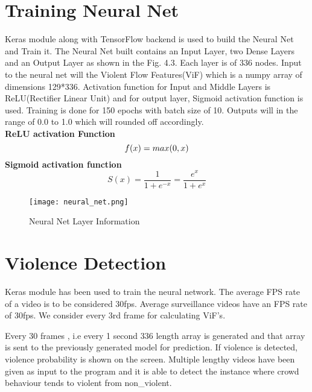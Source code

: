 \section{Training Neural Net}
Keras\cite{keras} module along with TensorFlow\cite{tensorflow} backend is used to build the Neural Net and Train it. The Neural Net built contains an Input Layer, two Dense Layers and an Output Layer as shown in the Fig. 4.3. Each layer is of 336 nodes. Input to the neural net will the Violent Flow Features(ViF) which is a numpy array of dimensions 129*336. Activation function for Input and Middle Layers is ReLU(Rectifier Linear Unit) and for output layer, Sigmoid activation function is used. Training is done for 150 epochs with batch size of 10. Outputs will in the range of 0.0 to 1.0 which will rounded off accordingly. \\
\textbf{ReLU activation Function} \\
\begin{equation}
f(x) = max(0,x)\\
\end{equation}
\textbf{Sigmoid activation function} \\
\begin{equation}
S(x) = \frac{1}{1+e^{-x}} = \frac{e^x}{1+e^x}
\end{equation}
\begin{center}
\begin{figure}[H]
\centering
\texttt{[image: neural\_net.png]}
\caption{Neural Net Layer Information}
\end{figure}
\end{center}
\section{Violence Detection}
Keras module has been used to train the neural network. The average FPS rate of a video is to be considered 30fps. Average surveillance videos have an FPS rate of 30fps. We consider every 3rd frame for calculating ViF’s. 
\par
	Every 30 frames , i.e every 1 second 336 length array is generated and that array is sent to the previously generated model for prediction. If violence is detected, violence probability is shown on the screen. Multiple lengthy videos have been given as input to the program and it is able to detect the instance where crowd behaviour tends to violent from non\_violent.


